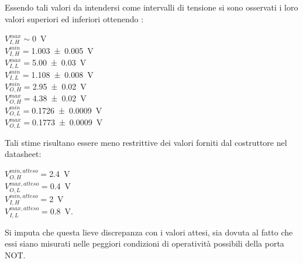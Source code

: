 Essendo tali valori da intendersi come intervalli di tensione si sono osservati i loro valori superiori ed inferiori ottenendo :
\begin{center}
	$V_{I,H}^{max}\sim$\SI{0}{\volt} \\
	$V_{I,H}^{min}=$\SI{1.003 \pm 0.005}{\volt}\\
	$V_{I,L}^{max}=$\SI{5.00 \pm 0.03}{\volt}\\
	$V_{I,L}^{min}=$\SI{1.108 \pm 0.008}{\volt}\\
	
	$V_{O,H}^{min}=$\SI{2.95 \pm 0.02}{\volt}\\
	$V_{O,H}^{max}=$\SI{4.38 \pm 0.02}{\volt}\\
	$V_{O,L}^{min}=$\SI{0.1726 \pm 0.0009}{\volt}\\
	$V_{O,L}^{max}=$\SI{0.1773 \pm 0.0009}{\volt}	\\
\end{center}

Tali stime risultano essere meno restrittive dei  valori
forniti dal costruttore nel datasheet:
\begin{center}
	
	$V_{O,H}^{min,atteso}=$\SI{2.4}{\volt}\\
	$V_{O,L}^{max,atteso}=$\SI{0.4}{\volt}\\
	$V_{I,H}^{min,atteso}=$\SI{2}{\volt}\\
	$V_{I,L}^{max,atteso}=$\SI{0.8}{\volt}.\\
\end{center}
Si imputa che questa lieve discrepanza 
con i valori attesi, sia dovuta al fatto che essi siano misurati nelle peggiori condizioni di operatività possibili della porta NOT.

